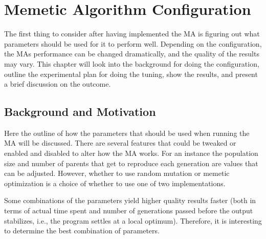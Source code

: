 \chapter{Memetic Algorithm Configuration} %
\label{cha:evolutionary_algorithm_configuration}

The first thing to consider after having implemented the MA is figuring out what parameters should be used for it to perform well. Depending on the configuration, the MAs performance can be changed dramatically, and the quality of the results may vary. This chapter will look into the background for doing the configuration, outline the experimental plan for doing the tuning, show the results, and present a brief discussion on the outcome.

\section{Background and Motivation} %
\label{sec:background_and_motivation}
Here the outline of how the parameters that should be used when running the MA will be discussed. There are several features that could be tweaked or enabled and disabled to alter how the MA works. For an instance the population size and number of parents that get to reproduce each generation are values that can be adjusted. However, whether to use random mutation or memetic optimization is a choice of whether to use one of two implementations.

Some combinations of the parameters yield higher quality results faster (both in terms of actual time spent and number of generations passed before the output stabilizes, i.e., the program settles at a local optimum). Therefore, it is interesting to determine the best combination of parameters.

